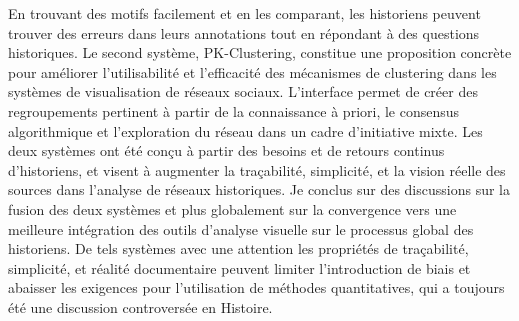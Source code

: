 {    En trouvant des motifs facilement et en les comparant, les historiens peuvent trouver des erreurs dans leurs annotations tout en répondant à des questions historiques.
    Le second système, PK-Clustering, constitue une proposition concrète pour améliorer l'utilisabilité et l'efficacité des mécanismes de clustering dans les systèmes de visualisation de réseaux sociaux.
    L'interface permet de créer des regroupements pertinent à partir de la connaissance à priori, le consensus algorithmique et l'exploration du réseau dans un cadre d'initiative mixte.
    Les deux systèmes ont été conçu à partir des besoins et de retours continus d'historiens, et visent à augmenter la traçabilité, simplicité, et la vision réelle des sources dans l'analyse de réseaux historiques.
    Je conclus sur des discussions sur la fusion des deux systèmes et plus globalement sur la convergence vers une meilleure intégration des outils d'analyse visuelle sur le processus global des historiens.
    De tels systèmes avec une attention les propriétés de traçabilité, simplicité, et réalité documentaire peuvent limiter l'introduction de biais et abaisser les exigences pour l'utilisation de méthodes quantitatives, qui a toujours été une discussion controversée en Histoire.
}


